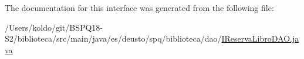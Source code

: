 The documentation for this interface was generated from the following file\+:\begin{DoxyCompactItemize}
\item 
/\+Users/koldo/git/\+B\+S\+P\+Q18-\/\+S2/biblioteca/src/main/java/es/deusto/spq/biblioteca/dao/\mbox{\hyperlink{_i_reserva_libro_d_a_o_8java}{I\+Reserva\+Libro\+D\+A\+O.\+java}}\end{DoxyCompactItemize}
